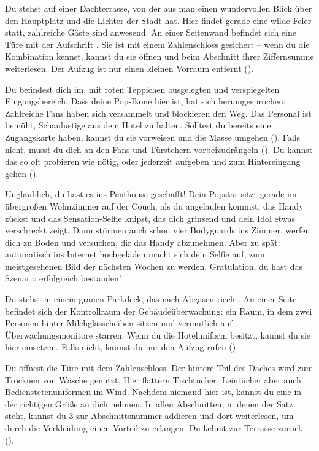 {	%
	 Du stehst auf einer Dachterrasse, von der aus man einen wundervollen Blick über den Hauptplatz und die Lichter der Stadt hat. Hier findet gerade eine wilde Feier statt, zahlreiche Gäste sind anwesend. An einer Seitenwand befindet sich eine Türe mit der Aufschrift . Sie ist mit einem Zahlenschloss gesichert -- wenn du die Kombination kennst, kannst du sie öffnen und beim Abschnitt ihrer Ziffernsumme weiterlesen. Der Aufzug ist nur einen kleinen Vorraum entfernt ().

		 Du befindest dich im, mit roten Teppichen ausgelegten und verspiegelten Eingangsbereich. Dass deine Pop-Ikone hier ist, hat sich herumgesprochen: Zahlreiche Fans haben sich versammelt und blockieren den Weg. Das Personal ist bemüht, Schaulustige aus dem Hotel zu halten. Solltest du bereits eine Zugangskarte haben, kannst du sie vorweisen und die Masse umgehen (). Falls nicht, musst du dich an den Fans und Türstehern vorbeizudrängeln (). Du kannst das so oft probieren wie nötig, oder jederzeit aufgeben und zum Hintereingang gehen ().

		 Unglaublich, du hast es ins Penthouse geschafft! Dein Popstar sitzt gerade im übergroßen Wohnzimmer auf der Couch, als du angelaufen kommst, das Handy zückst und das Sensation-Selfie knipst, das dich grinsend und dein Idol etwas verschreckt zeigt. Dann stürmen auch schon vier Bodyguards ins Zimmer, werfen dich zu Boden und versuchen, dir das Handy abzunehmen. Aber zu spät: automatisch ins Internet hochgeladen macht sich dein Selfie auf, zum meistgesehenen Bild der nächsten Wochen zu werden. Gratulation, du hast das Szenario erfolgreich bestanden!

	 Du stehst in einem grauen Parkdeck, das nach Abgasen riecht. An einer Seite befindet sich der Kontrollraum der Gebäudeüberwachung: ein Raum, in dem zwei Personen hinter Milchglasscheiben sitzen und vermutlich auf Überwachungsmonitore starren. Wenn du die Hoteluniform besitzt, kannst du sie hier einsetzen. Falls nicht, kannst du nur den Aufzug rufen ().

	 Du öffnest die Türe mit dem Zahlenschloss. Der hintere Teil des Daches wird zum Trocknen von Wäsche genutzt. Hier flattern Tischtücher, Leintücher aber auch Bedienstetenuniformen im Wind. Nachdem niemand hier ist, kannst du eine in der richtigen Größe an dich nehmen. In allen Abschnitten, in denen der Satz  steht, kannst du 3 zur Abschnittsnummer addieren und dort weiterlesen, um durch die Verkleidung einen Vorteil zu erlangen. Du kehrst zur Terrasse zurück ().

}

